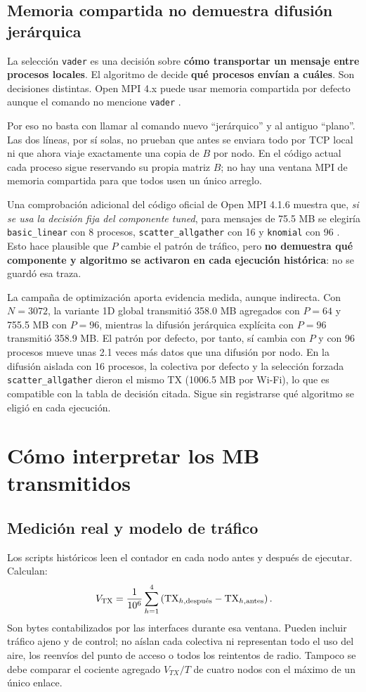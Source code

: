 \subsection{Memoria compartida no demuestra difusión jerárquica}
La selección \texttt{vader} es una decisión sobre \textbf{cómo transportar un mensaje entre procesos locales}. El algoritmo de  decide \textbf{qué procesos envían a cuáles}. Son decisiones distintas. Open MPI 4.x puede usar memoria compartida por defecto aunque el comando no mencione \texttt{vader} \cite{ompi-tcp}.

Por eso no basta con llamar al comando nuevo ``jerárquico'' y al antiguo ``plano''. Las dos líneas, por sí solas, no prueban que antes se enviara todo por TCP local ni que ahora viaje exactamente una copia de $B$ por nodo. En el código actual cada proceso sigue reservando su propia matriz $B$; no hay una ventana MPI de memoria compartida para que todos usen un único arreglo.

Una comprobación adicional del código oficial de Open MPI 4.1.6 muestra que, \emph{si se usa la decisión fija del componente tuned}, para mensajes de 75.5 MB se elegiría \texttt{basic\_linear} con 8 procesos, \texttt{scatter\_allgather} con 16 y \texttt{knomial} con 96 \cite{ompi-source}. Esto hace plausible que $P$ cambie el patrón de tráfico, pero \textbf{no demuestra qué componente y algoritmo se activaron en cada ejecución histórica}: no se guardó esa traza.

La campaña de optimización aporta evidencia medida, aunque indirecta. Con $N=3072$, la variante 1D global transmitió 358.0 MB agregados con $P=64$ y 755.5 MB con $P=96$, mientras la difusión jerárquica explícita con $P=96$ transmitió 358.9 MB. El patrón por defecto, por tanto, sí cambia con $P$ y con 96 procesos mueve unas 2.1 veces más datos que una difusión por nodo. En la difusión aislada con 16 procesos, la colectiva por defecto y la selección forzada \texttt{scatter\_allgather} dieron el mismo TX (1006.5 MB por Wi-Fi), lo que es compatible con la tabla de decisión citada. Sigue sin registrarse qué algoritmo se eligió en cada ejecución.

\section{Cómo interpretar los MB transmitidos}

\subsection{Medición real y modelo de tráfico}
Los scripts históricos leen el contador  en cada nodo antes y después de ejecutar. Calculan:
\[
 V_{\rm TX}=\frac{1}{10^6}\sum_{h=1}^{4}
  \left(\mathrm{TX}_{h,\text{después}}-\mathrm{TX}_{h,\text{antes}}\right).
\]
Son bytes contabilizados por las interfaces durante esa ventana. Pueden incluir tráfico ajeno y de control; no aíslan cada colectiva ni representan todo el uso del aire, los reenvíos del punto de acceso o todos los reintentos de radio. Tampoco se debe comparar el cociente agregado $V_{TX}/T$ de cuatro nodos con el máximo de un único enlace.

